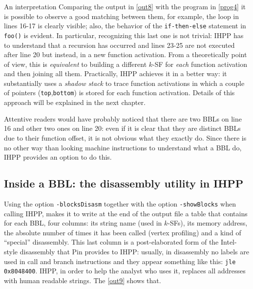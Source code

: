 \documentclass[a4paper,10pt]{report}
\begin{document}
\begin{paragraph}{An interpretation}
Comparing the output in \cref{out8} with the program in \cref{prog4} it is possible to
observe a good matching between them, for example, the loop in lines 16-17
is clearly visible; also, the behavior of the \verb|if-then-else| statement in \verb|foo()| is evident. In particular, recognizing this last one is not trivial:
IHPP has to understand that a recursion has occurred and lines 23-25
are not executed after line 20 but instead, in a new function activation.
From a theoretically point of view,
this is \emph{equivalent} to building a different $k$-SF
for \emph{each} function activation and then joining all them.
Practically, IHPP achieves it in a better way:
it substantially uses a \emph{shadow stack} to trace function activations in which
a couple of pointers (\verb|top|,\verb|bottom|) is stored for each
function activation. Details of this approach will be explained in the next chapter.
\end{paragraph}

Attentive readers would have probably noticed that there are two BBLs on line 16
and other two ones on line 20: even if it is clear that they are distinct
BBLs due to their function offset, it is not obvious what they exactly do.
Since there is no other way than looking machine instructions to understand
what a BBL do, IHPP provides an option to do this.

\subsection{Inside a BBL: the disassembly utility in IHPP}

Using the option \verb|-blocksDisasm| together with the option \verb|-showBlocks|
when calling IHPP, makes it to write at the end of the output file a table
that contains for each BBL, four columns: its string name (used in $k$-SFs), its memory address, the absolute number of times it has been called (vertex profiling) and
a kind of ``special'' disassembly. This last column is a post-elaborated form
of the Intel-style disassembly that Pin provides to IHPP: usually, in disassembly
no labels are used in call and branch instructions and they appear something like this:
\verb|jle 0x8048400|. IHPP, in order to help the analyst who uses it, replaces
all addresses with human readable strings. The \cref{out9} shows that.
\end{document}
